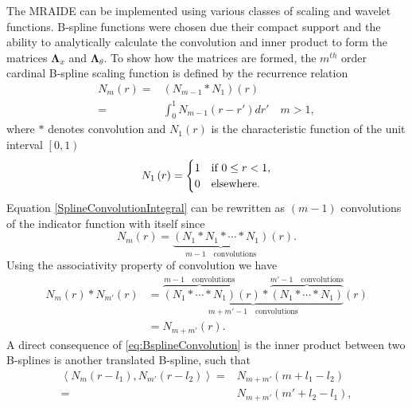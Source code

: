 \documentclass[journal]{IEEEtran}
\begin{document}
The MRAIDE can be implemented using various classes of scaling and wavelet functions. B-spline functions were chosen due their compact support and the ability to analytically calculate the convolution and inner product to form the matrices $ \boldsymbol\Lambda_x$ and $\boldsymbol \Lambda_{\theta}$. To show how the matrices are formed, the $m^{th}$ order cardinal B-spline scaling function is defined by the recurrence relation \cite{Chui1992} 
\begin{align}
N_{m}\left(r\right)=&\left(N_{m-1}\ast N_{1}\right)\left(r\right)\nonumber \\
=&\int_0^{1} N_{m-1}\left( r-r'\right)dr' \quad m>1,
\label{SplineConvolutionIntegral}
\end{align}
where $\ast$ denotes convolution and $N_1\left(r\right)$ is the characteristic function of the unit interval $\left[ 0,1\right)$
\begin{equation}
N_{1}\left(r\right)=
\begin{cases}
1 & \text{if $ 0\le r<1$}, \\
0 & \mathrm{elsewhere}.
\end{cases}
\end{equation}
Equation \eqref{SplineConvolutionIntegral} can be rewritten as $(m-1)$ convolutions of the indicator function with itself since
\begin{equation}
 N_{m}\left(r\right)=\underbrace{\left(N_{1}\ast N_{1}\ast \cdots \ast N_{1}\right)}_{m-1\quad \text{convolutions}}\left(r\right).
\end{equation}
Using the associativity property of convolution we have
\setlength{\arraycolsep}{0.0em}
\begin{align}\label{eq:BsplineConvolution}
N_{m}\left( r\right) \ast N_{m'}\left(r\right)&=\underbrace{\overbrace{\left(N_{1} \ast \cdots \ast N_{1}\right)}^{m-1 \quad \text{convolutions}}\left(r\right) \ast \overbrace{\left(N_{1} \ast \cdots \ast N_{1}\right)}^{m'-1\quad \text{convolutions}}}_{m+m'-1 \quad \text{convolutions}}\left(r\right)\nonumber\\
&=N_{m+m'}\left(r\right).
\end{align}
A direct consequence of \eqref{eq:BsplineConvolution} is the inner product between two B-splines is another translated B-spline, such that
\begin{align}
 \left\langle N_{m}\left(r-l_{1}\right), N_{m'}\left(r-l_{2}\right)\right\rangle=&N_{m+m'}\left(m+l_{1}-l_{2}\right)\nonumber \\
=&N_{m+m'}\left(m'+l_{2}-l_{1}\right),
\label{eq:BsplineInnerProduct}
\end{align}
\end{document}
